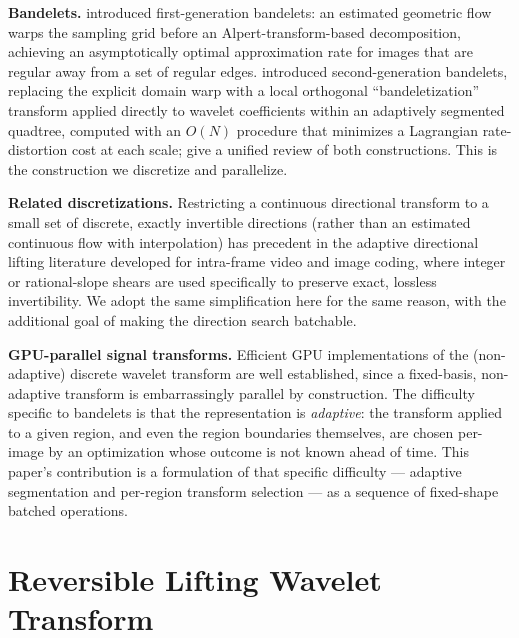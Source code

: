 \documentclass[11pt]{article}
\begin{document}
\textbf{Bandelets.} \citet{lepennec2005sparse} introduced first-generation
bandelets: an estimated geometric flow warps the sampling grid before an
Alpert-transform-based decomposition, achieving an asymptotically optimal
approximation rate for images that are regular away from a set of regular
edges. \citet{peyre2005surface,peyre2005discrete} introduced
second-generation bandelets, replacing the explicit domain warp with a local
orthogonal ``bandeletization'' transform applied directly to wavelet
coefficients within an adaptively segmented quadtree, computed with an
$O(N)$ procedure that minimizes a Lagrangian rate-distortion cost at each
scale; \citet{mallat2008review} give a unified review of both constructions.
This is the construction we discretize and parallelize.

\textbf{Related discretizations.} Restricting a continuous directional
transform to a small set of discrete, exactly invertible directions (rather
than an estimated continuous flow with interpolation) has precedent in the
adaptive directional lifting literature developed for intra-frame video and
image coding, where integer or rational-slope shears are used specifically
to preserve exact, lossless invertibility. We adopt the same simplification
here for the same reason, with the additional goal of making the direction
search batchable.

\textbf{GPU-parallel signal transforms.} Efficient GPU implementations of
the (non-adaptive) discrete wavelet transform are well established, since a
fixed-basis, non-adaptive transform is embarrassingly parallel by
construction. The difficulty specific to bandelets is that the representation
is \emph{adaptive}: the transform applied to a given region, and even the
region boundaries themselves, are chosen per-image by an optimization whose
outcome is not known ahead of time. This paper's contribution is a
formulation of that specific difficulty --- adaptive segmentation and
per-region transform selection --- as a sequence of fixed-shape batched
operations.

\section{Reversible Lifting Wavelet Transform}
\label{sec:lifting}
\end{document}
